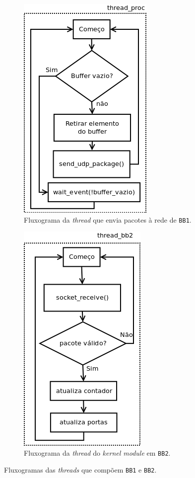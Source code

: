 \begin{figure}[h!]
\begin{subfigure}{.33\textwidth}
		\end{subfigure}%
		\begin{subfigure}{.33\textwidth}
		  \centering
		  \includegraphics[scale=0.55]{image/thread_proc}
		  \caption{\centering Fluxograma da \textit{thread} que envia pacotes à
		  rede de \texttt{BB1}.}
		  \label{fig:thread_proc} 
		\end{subfigure}%
		\begin{subfigure}{.33\textwidth}
			\centering
			\includegraphics[scale=0.55]{image/thread_bb2}
			\caption {\centering Fluxograma da \textit{thread} do \textit{kernel module}
			em
			\texttt{BB2}.}
			\label{fig:thread_bb2}
		\end{subfigure}%
		\caption{Fluxogramas das \textit{threads} que compõem \texttt{BB1}
		e \texttt{BB2}.}
		\label{fig:threads_bb1}
		\end{figure} 


